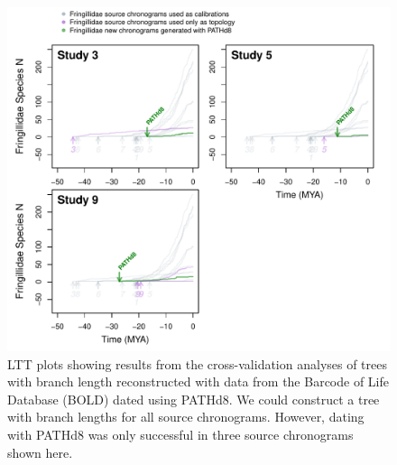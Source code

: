 \newpage
\begin{figure}[!h]
\includegraphics{../figures/fig_crossval_boldsumm.pdf}
\caption{LTT plots showing results from the cross-validation analyses of trees with branch length reconstructed with data from the Barcode of Life Database (BOLD) dated using PATHd8. We could construct a tree with branch lengths for all source chronograms. However, dating with PATHd8 was only successful in three source chronograms shown here.}
\label{fig:cvbold}
\end{figure}
